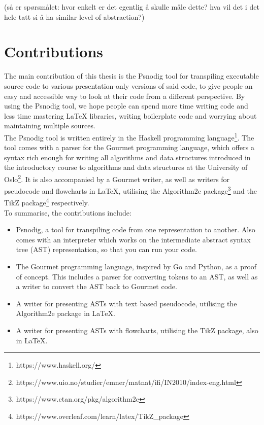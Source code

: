 (så er spørsmålet: hvor enkelt er det egentlig å skulle måle dette? hva vil det i det hele tatt si å ha similar level of abstraction?)

\section{Contributions}

The main contribution of this thesis is the Psnodig tool for transpiling executable source code to various presentation-only versions of said code, to give people an easy and accessible way to look at their code from a different perspective. By using the Psnodig tool, we hope people can spend more time writing code and less time mastering LaTeX libraries, writing boilerplate code and worrying about maintaining multiple sources. \hfill \\

The Psnodig tool is written entirely in the Haskell programming language\footnote{https://www.haskell.org/}. The tool comes with a parser for the Gourmet programming language, which offers a syntax rich enough for writing all algorithms and data structures introduced in the introductory course to algorithms and data structures at the University of Oslo\footnote{https://www.uio.no/studier/emner/matnat/ifi/IN2010/index-eng.html}. It is also accompanied by a Gourmet writer, as well as writers for pseudocode and flowcharts in LaTeX, utilising the Algorithm2e package\footnote{https://www.ctan.org/pkg/algorithm2e} and the TikZ package\footnote{https://www.overleaf.com/learn/latex/TikZ\_package} respectively. \hfill \\

To summarise, the contributions include:
\begin{itemize}
    \item Psnodig, a tool for transpiling code from one representation to another. Also comes with an interpreter which works on the intermediate abstract syntax tree (AST) representation, so that you can run your code.
    \item The Gourmet programming language, inspired by Go and Python, as a proof of concept. This includes a parser for converting tokens to an AST, as well as a writer to convert the AST back to Gourmet code.
    \item A writer for presenting ASTs with text based pseudocode, utilising the Algorithm2e package in LaTeX.
    \item A writer for presenting ASTs with flowcharts, utilising the TikZ package, also in LaTeX.
\end{itemize}

